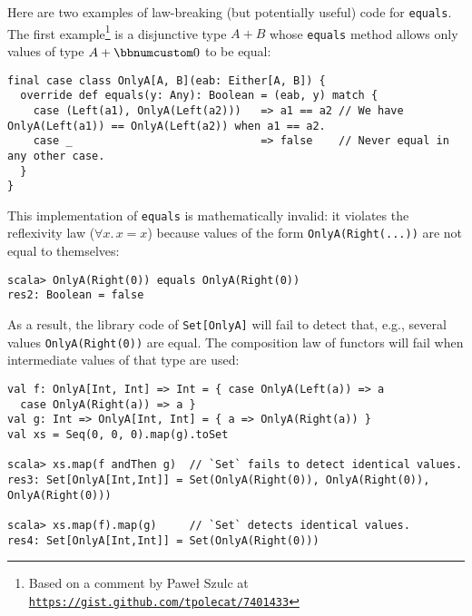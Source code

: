 Here are two examples of law-breaking (but potentially useful) code
for \lstinline!equals!. The first example\footnote{Based on a comment by Pawe\l{} Szulc
at \texttt{\href{https://gist.github.com/tpolecat/7401433}{https://gist.github.com/tpolecat/7401433}}} is a disjunctive type $A+B$ whose \lstinline!equals! method allows
only values of type $A+\bbnum 0$ to be equal:
\begin{lstlisting}
final case class OnlyA[A, B](eab: Either[A, B]) {
  override def equals(y: Any): Boolean = (eab, y) match {
    case (Left(a1), OnlyA(Left(a2)))   => a1 == a2 // We have OnlyA(Left(a1)) == OnlyA(Left(a2)) when a1 == a2.
    case _                             => false    // Never equal in any other case.
  }
}
\end{lstlisting}
This implementation of \lstinline!equals! is mathematically invalid:
it violates the reflexivity law ($\forall x.\,x=x$) because values
of the form \lstinline!OnlyA(Right(...))! are not equal to themselves:
\begin{lstlisting}
scala> OnlyA(Right(0)) equals OnlyA(Right(0))
res2: Boolean = false
\end{lstlisting}
As a result, the library code of \lstinline!Set[OnlyA]! will fail
to detect that, e.g., several values \lstinline!OnlyA(Right(0))!
are equal. The composition law of functors will fail when intermediate
values of that type are used:
\begin{lstlisting}
val f: OnlyA[Int, Int] => Int = { case OnlyA(Left(a)) => a
  case OnlyA(Right(a)) => a }
val g: Int => OnlyA[Int, Int] = { a => OnlyA(Right(a)) }
val xs = Seq(0, 0, 0).map(g).toSet

scala> xs.map(f andThen g)  // `Set` fails to detect identical values.
res3: Set[OnlyA[Int,Int]] = Set(OnlyA(Right(0)), OnlyA(Right(0)), OnlyA(Right(0)))

scala> xs.map(f).map(g)     // `Set` detects identical values.
res4: Set[OnlyA[Int,Int]] = Set(OnlyA(Right(0)))
\end{lstlisting}


